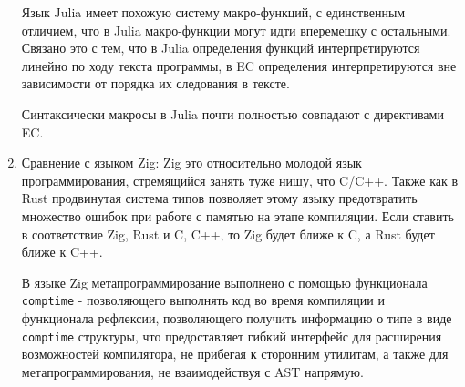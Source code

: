 \begin{enumerate}
Язык Julia имеет похожую систему макро-функций\cite{julia-meta}, с единственным отличием, что в Julia макро-функции могут идти вперемешку с остальными. 
Связано это с тем, что в Julia определения функций интерпретируются линейно по ходу текста программы, в EC определения интерпретируются вне зависимости от порядка их следования в тексте.

Синтаксически макросы в Julia почти полностью совпадают с директивами EC.

\item\label{langcmp:zig} Сравнение с языком Zig:\newline
Zig это относительно молодой язык программирования, стремящийся занять туже нишу, что C/C++. 
Также как в Rust продвинутая система типов позволяет этому языку предотвратить множество ошибок при работе с памятью на этапе компиляции.
Если ставить в соответствие Zig, Rust и C, C++, то Zig будет ближе к C, а Rust будет ближе к C++.

В языке Zig метапрограммирование выполнено с помощью функционала \verb|comptime| - позволяющего выполнять код во время компиляции и функционала рефлексии, 
позволяющего получить информацию о типе в виде \verb|comptime| структуры, что предоставляет гибкий интерфейс для расширения возможностей компилятора, не прибегая 
к сторонним утилитам, а также для метапрограммирования, не взаимодействуя с AST напрямую.
\end{enumerate}